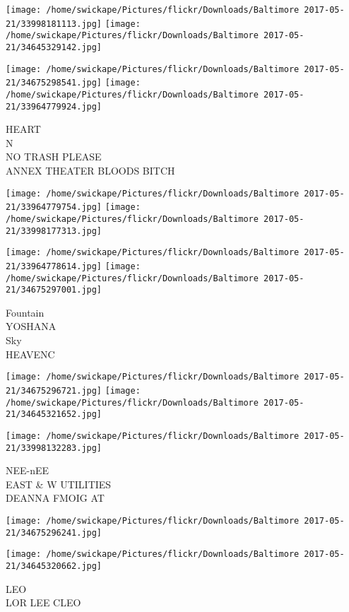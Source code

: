 \documentclass[10pt,letterpaper]{article}
\begin{document}
\texttt{[image: /home/swickape/Pictures/flickr/Downloads/Baltimore 2017-05-21/33998181113.jpg]}
\texttt{[image: /home/swickape/Pictures/flickr/Downloads/Baltimore 2017-05-21/34645329142.jpg]}

\texttt{[image: /home/swickape/Pictures/flickr/Downloads/Baltimore 2017-05-21/34675298541.jpg]}
\texttt{[image: /home/swickape/Pictures/flickr/Downloads/Baltimore 2017-05-21/33964779924.jpg]}

HEART\\
N\\
NO TRASH PLEASE\\
ANNEX THEATER BLOODS BITCH
\pagebreak

\texttt{[image: /home/swickape/Pictures/flickr/Downloads/Baltimore 2017-05-21/33964779754.jpg]}
\texttt{[image: /home/swickape/Pictures/flickr/Downloads/Baltimore 2017-05-21/33998177313.jpg]}

\texttt{[image: /home/swickape/Pictures/flickr/Downloads/Baltimore 2017-05-21/33964778614.jpg]}
\texttt{[image: /home/swickape/Pictures/flickr/Downloads/Baltimore 2017-05-21/34675297001.jpg]}

Fountain\\
YOSHANA\\
Sky\\
HEAVENC
\pagebreak

\texttt{[image: /home/swickape/Pictures/flickr/Downloads/Baltimore 2017-05-21/34675296721.jpg]}
\texttt{[image: /home/swickape/Pictures/flickr/Downloads/Baltimore 2017-05-21/34645321652.jpg]}

\vspace{0.25in}
\texttt{[image: /home/swickape/Pictures/flickr/Downloads/Baltimore 2017-05-21/33998132283.jpg]}

NEE{-}nEE\\
EAST \& W UTILITIES\\
DEANNA FMOIG AT
\pagebreak

\texttt{[image: /home/swickape/Pictures/flickr/Downloads/Baltimore 2017-05-21/34675296241.jpg]}

\vspace{0.25in}
\texttt{[image: /home/swickape/Pictures/flickr/Downloads/Baltimore 2017-05-21/34645320662.jpg]}

LEO\\
LOR LEE CLEO
\pagebreak
\end{document}
